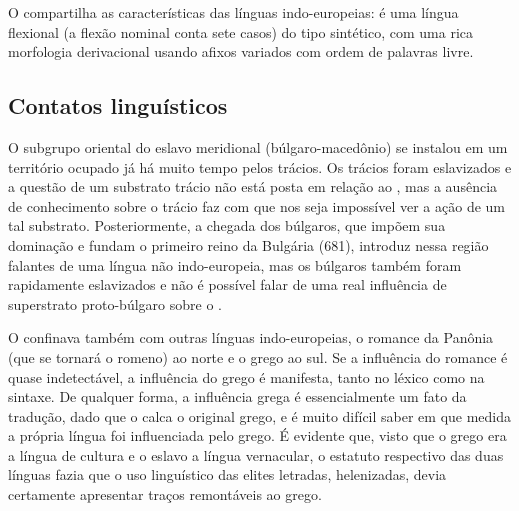 O  compartilha as características das línguas indo-europeias: é uma língua
flexional (a flexão nominal conta sete casos) do tipo sintético, com uma rica
morfologia derivacional usando afixos variados com ordem de palavras livre.

\subsection{Contatos linguísticos}
O subgrupo oriental do eslavo meridional (búlgaro-macedônio) se instalou em um
território ocupado já há muito tempo pelos trácios. Os trácios foram
eslavizados e a questão de um substrato trácio não está posta em relação ao
, mas a ausência de conhecimento sobre o trácio faz com que nos seja
impossível ver a ação de um tal substrato. Posteriormente, a chegada dos
búlgaros, que impõem sua dominação e fundam o primeiro reino da Bulgária
(681), introduz nessa região falantes de uma língua não indo-europeia, mas os
búlgaros também foram rapidamente eslavizados e não é possível falar de uma
real influência de superstrato proto-búlgaro sobre o .

O  confinava também com outras línguas indo-europeias, o romance da Panônia
(que se tornará o romeno) ao norte e o grego ao sul. Se a influência do
romance é quase indetectável, a influência do grego é manifesta, tanto no
léxico como na sintaxe. De qualquer forma, a influência grega é essencialmente
um fato da tradução, dado que o  calca o original grego, e é muito difícil
saber em que medida a própria língua foi influenciada pelo grego. É evidente
que, visto que o grego era a língua de cultura e o eslavo a língua vernacular,
o estatuto respectivo das duas línguas fazia que o uso linguístico das elites
letradas, helenizadas, devia certamente apresentar traços remontáveis ao
grego.

